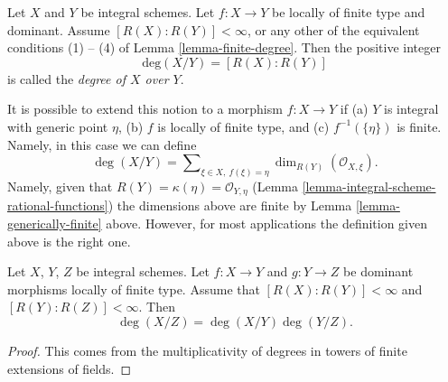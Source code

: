 \begin{definition}
\label{definition-degree}
Let $X$ and $Y$ be integral schemes.
Let $f : X \to Y$ be locally of finite type and dominant.
Assume $[R(X) : R(Y)] < \infty$, or any other of the equivalent
conditions (1) -- (4) of Lemma \ref{lemma-finite-degree}.
Then the positive integer
$$
\text{deg}(X/Y) = [R(X) : R(Y)]
$$
is called the {\it degree of $X$ over $Y$}.
\end{definition}

\noindent
It is possible to extend this notion to a morphism
$f : X \to Y$ if (a) $Y$ is integral with generic point $\eta$,
(b) $f$ is locally of finite type, and (c) $f^{-1}(\{\eta\})$ is finite.
Namely, in this case we can define
$$
\deg(X/Y)
=
\sum\nolimits_{\xi \in X,\ f(\xi) = \eta}
\dim_{R(Y)} (\mathcal{O}_{X, \xi}).
$$
Namely, given that $R(Y) = \kappa(\eta) = \mathcal{O}_{Y, \eta}$
(Lemma \ref{lemma-integral-scheme-rational-functions})
the dimensions above are finite by
Lemma \ref{lemma-generically-finite} above.
However, for most applications the definition given above
is the right one.

\begin{lemma}
\label{lemma-degree-composition}
Let $X$, $Y$, $Z$ be integral schemes.
Let $f : X \to Y$ and $g : Y \to Z$ be dominant morphisms locally
of finite type. Assume that $[R(X) : R(Y)] < \infty$ and
$[R(Y) : R(Z)] < \infty$. Then
$$
\deg(X/Z) = \deg(X/Y) \deg(Y/Z).
$$
\end{lemma}

\begin{proof}
This comes from the multiplicativity of degrees in towers
of finite extensions of fields.
\end{proof}































